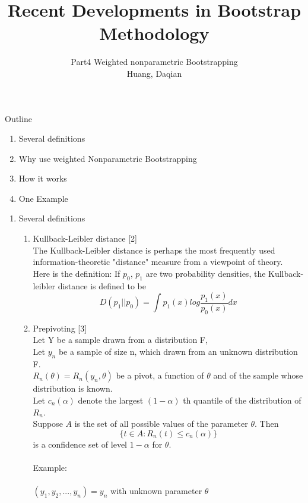 \documentclass[a4paper,11pt]{article}
\begin{document}
\title{Recent Developments in Bootstrap Methodology}
\author{ Part4 Weighted nonparametric Bootstrapping \\ Huang, Daqian}
\date{}
\maketitle

Outline \\
\begin{enumerate}
\item Several definitions
\item Why use weighted Nonparametric Bootstrapping
\item How it works
\item One Example
\end{enumerate}

\begin{enumerate}
\item Several definitions
  \begin{enumerate}
  \item Kullback-Leibler distance [2]\\
  The Kullback-Leibler distance is perhaps the most frequently used information-theoretic "distance" measure from a viewpoint of theory. \\
  Here is the definition: If $ p_0 $, $ p_1 $ are two probability densities, the Kullback-leibler distance is defined to be 
  $$ D(p_1 || p_0) =\int p_1(x) log \dfrac{p_1(x)}{p_0(x)} dx $$
  
  \item Prepivoting [3] \\
  Let Y be a sample drawn from a distribution F,\\
  Let $ y_n $ be a sample of size n, which drawn from an unknown distribution F. \\
  $ R_n (\theta)= R_n (y_n, \theta ) $ be a pivot, a function of $ \theta $ and of the sample whose distribution is known. \\
  Let $ c_n (\alpha) $ denote the largest $ (1- \alpha ) $ th quantile of the distribution of $ R_n $. \\
  Suppose $ A $ is the set of all possible values of the parameter $ \theta $. Then $$ \{ t \in A : R_n(t) \le c_n (\alpha) \} $$ is a confidence set of level $ 1- \alpha $ for $ \theta $. \\  \\
  Example:\\ \\
  $ (y_1, y_2, ..., y_n )=y_n $ with unknown parameter $ \theta $  \\ \\
  

\end{enumerate}
\end{enumerate}
\end{document}
